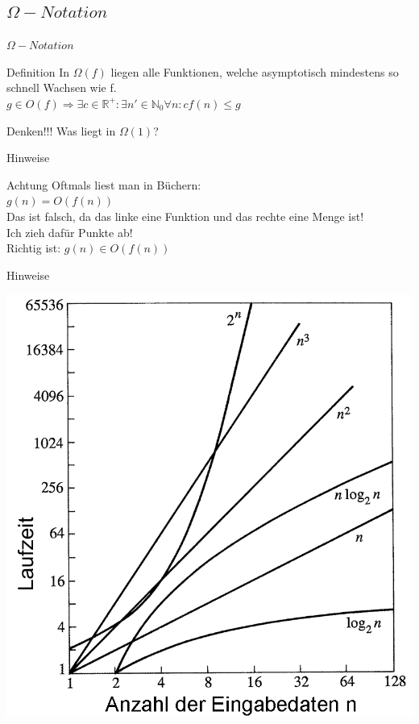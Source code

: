 	
	\subsection{$\Omega - Notation$}
	\begin{frame}{$\Omega - Notation$}
		\begin{block}{Definition}
			In $\Omega(f)$ liegen alle Funktionen, welche asymptotisch mindestens so schnell Wachsen wie f.\\
			$g \in O(f) \Rightarrow \exists c \in \mathbb{R}^+ : \exists n' \in \mathbb{N}_0 \forall n: cf(n) \leq g$
		\end{block}
		
		\pause
		\begin{block}{Denken!!!}
			Was liegt in $\Omega(1)$?
		\end{block}
	\end{frame}
	
	
	
	\begin{frame}{Hinweise}
		\begin{alertblock}{Achtung}
			Oftmals liest man in Büchern:\\
			$g(n) = O(f(n))$\\
			Das ist falsch, da das linke eine Funktion und das rechte eine Menge ist!\\
			Ich zieh dafür Punkte ab!\\
			Richtig ist: $g(n) \in O(f(n))$
		\end{alertblock}
	\end{frame}
	
	\begin{frame}{Hinweise}
		\begin{center}
			\includegraphics[scale=0.25]{graphics/09/laufzeiten.png}
		\end{center}
	\end{frame}
	
